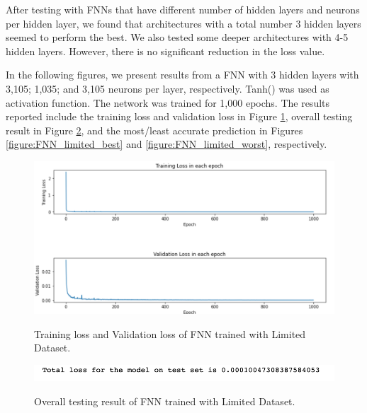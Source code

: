 After testing with FNNs that have different number of hidden layers and neurons per hidden layer, we found that architectures with a total number 3 hidden layers seemed to perform the best. We also tested some deeper architectures with 4-5 hidden layers. However, there is no significant reduction in the loss value.

In the following figures, we present results from a FNN with 3 hidden layers with 3,105; 1,035; and 3,105 neurons per layer, respectively. Tanh() was used as activation function. The network was trained for 1,000 epochs. The results reported include the training loss and validation loss in Figure \ref{figure:FNN_limited_losses}, overall testing result in Figure \ref{figure:FNN_limited_testing}, and the most/least accurate prediction in Figures \ref{figure:FNN_limited_best} and \ref{figure:FNN_limited_worst}, respectively.

\begin{figure}[H]
    \caption{Training loss and Validation loss of FNN trained with Limited Dataset.}
    \includegraphics[scale=0.6]{figures/mantle_convection_images/limited_dataset/FNN_trainingData.png}
    \label{figure:FNN_limited_losses}
\end{figure}

\begin{figure}[H]
    \caption{Overall testing result of FNN trained with Limited Dataset.}
    \includegraphics[scale=0.8]{figures/mantle_convection_images/limited_dataset/FNN_OverallTesting.png}
    \label{figure:FNN_limited_testing}
\end{figure}

